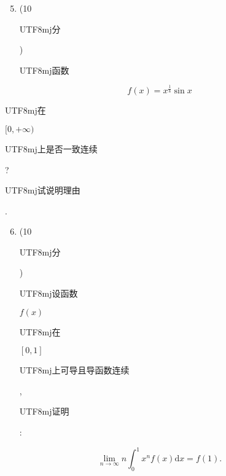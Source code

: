 \documentclass[10pt]{article}
\begin{document}
\begin{enumerate}
  \setcounter{enumi}{4}
  \item (10 \begin{CJK}{UTF8}{mj}分\end{CJK}) \begin{CJK}{UTF8}{mj}函数\end{CJK}
\end{enumerate}
$$
f(x)=x^{\frac{1}{8}} \sin x
$$
\begin{CJK}{UTF8}{mj}在\end{CJK} $[0,+\infty)$ \begin{CJK}{UTF8}{mj}上是否一致连续\end{CJK}? \begin{CJK}{UTF8}{mj}试说明理由\end{CJK}.

\begin{enumerate}
  \setcounter{enumi}{5}
  \item (10 \begin{CJK}{UTF8}{mj}分\end{CJK}) \begin{CJK}{UTF8}{mj}设函数\end{CJK} $f(x)$ \begin{CJK}{UTF8}{mj}在\end{CJK} $[0,1]$ \begin{CJK}{UTF8}{mj}上可导且导函数连续\end{CJK}, \begin{CJK}{UTF8}{mj}证明\end{CJK}:
\end{enumerate}
$$
\lim _{n \rightarrow \infty} n \int_{0}^{1} x^{n} f(x) \mathrm{d} x=f(1) .
$$
\end{document}
